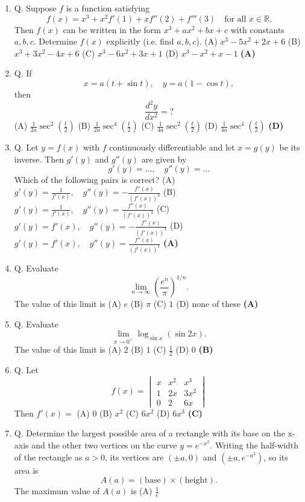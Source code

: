 \documentclass{article}
\begin{document}
\begin{enumerate}
(A) $x (y')^3 = 1 + y'$
(B) $x (y')^3 = 1 - y'$
(C) $x (y')^2 = 1 + y'$
(D) $x (y')^3 = y' – 1$ \hfill \textbf{(A)}
\item Q. Suppose $f$ is a function satisfying
$$f(x) = x^3 + x^2 f'(1) + x f''(2) + f'''(3) \quad \text{for all } x \in \mathbb{R}.$$Then $f(x)$ can be written in the form $x^3 + ax^2 + bx + c$ with constants $a, b, c$. Determine $f(x)$ explicitly (i.e. find $a, b, c$).
(A) $x^3 - 5x^2 + 2x + 6$
(B) $x^3 + 3x^2 - 4x + 6$
(C) $x^3 - 6x^2 + 3x + 1$
(D) $x^3 - x^2 + x - 1$ \hfill \textbf{(A)}
\item Q. If
$$x = a(t + \sin t), \quad y = a(1-\cos t),$$then
$$\frac{d^2y}{dx^2} =?$$
(A) $\frac{1}{2a}\sec^2\left(\frac{t}{2}\right)$
(B) $\frac{1}{2a}\sec^4\left(\frac{t}{2}\right)$
(C) $\frac{1}{4a}\sec^2\left(\frac{t}{2}\right)$
(D) $\frac{1}{4a}\sec^4\left(\frac{t}{2}\right)$ \hfill \textbf{(D)}
\item Q. Let $y = f(x)$ with $f$ continuously differentiable and let $x = g(y)$ be its inverse. Then $g'(y)$ and $g''(y)$ are given by
$$g'(y) = \dots, \quad g''(y) = \dots$$Which of the following pairs is correct?
(A) $g'(y) = \frac{1}{f'(x)}, \quad g''(y) = -\frac{f''(x)}{(f'(x))^3}$
(B) $g'(y) = \frac{1}{f'(x)}, \quad g''(y) = \frac{f''(x)}{(f'(x))^2}$
(C) $g'(y) = f'(x), \quad g''(y) = -\frac{f''(x)}{(f'(x))^3}$
(D) $g'(y) = f'(x), \quad g''(y) = \frac{f''(x)}{(f'(x))^2}$ \hfill \textbf{(A)}
\item Q. Evaluate
$$\lim_{n\to\infty} \left(\frac{e^n}{\pi}\right)^{1/n}.$$The value of this limit is
(A) $e$
(B) $\pi$
(C) $1$
(D) none of these \hfill \textbf{(A)}
\item Q. Evaluate
$$\lim_{x\to 0^+} \log_{\sin x} (\sin 2x).$$The value of this limit is
(A) $2$
(B) $1$
(C) $\frac{1}{2}$
(D) $0$ \hfill \textbf{(B)}
\item Q. Let
$$f(x) = \begin{vmatrix} x & x^2 & x^3 \\ 1 & 2x & 3x^2 \\ 0 & 2 & 6x \end{vmatrix}$$Then $f'(x) =$
(A) $0$
(B) $x^2$
(C) $6x^2$
(D) $6x^3$ \hfill \textbf{(C)}
\item Q. Determine the largest possible area of a rectangle with its base on the x-axis and the other two vertices on the curve $y = e^{-x^2}$. Writing the half-width of the rectangle as $a > 0$, its vertices are $(\pm a, 0)$ and $(\pm a, e^{-a^2})$, so its area is
$$A(a) = (\text{base}) \times (\text{height}).$$The maximum value of $A(a)$ is
(A) $\frac{1}{e}$

\end{enumerate}
\end{document}
